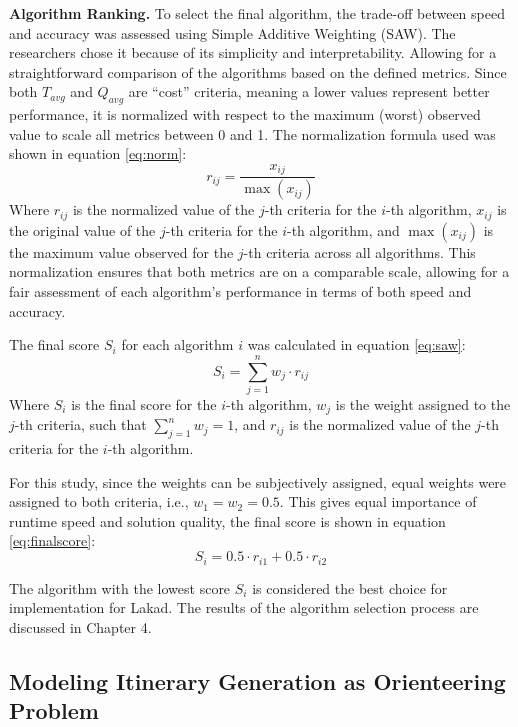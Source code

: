 \textbf{Algorithm Ranking.} To select the final algorithm, the trade-off between speed and accuracy was assessed using Simple Additive Weighting (SAW). The researchers chose it because of its simplicity and interpretability. Allowing for a straightforward comparison of the algorithms based on the defined metrics. Since both $T _{avg}$ and $Q_{avg}$ are “cost” criteria, meaning a lower values represent better performance, it is normalized with respect to the maximum (worst) observed value to scale all metrics between 0 and 1. The normalization formula used was shown in equation \ref{eq:norm}:
\begin{equation}
	\label{eq:norm}
	r _{ij} = \frac{x_{ij}}{\max(x_{ij})}
\end{equation}
Where $r _{ij}$ is the normalized value of the $j$-th criteria for the $i$-th algorithm, $x_{ij}$ is the original value of the $j$-th criteria for the $i$-th algorithm, and $\max(x_{ij})$ is the maximum value observed for the $j$-th criteria across all algorithms. This normalization ensures that both metrics are on a comparable scale, allowing for a fair assessment of each algorithm’s performance in terms of both speed and accuracy. 

The final score $S _{i}$ for each algorithm $i$ was calculated in equation \ref{eq:saw}: 
\begin{equation}
	\label{eq:saw}
	S _{i} = \sum_{j=1}^{n} w_j \cdot r _{ij}
\end{equation}
Where $S _{i}$ is the final score for the $i$-th algorithm, $w_j$ is the weight assigned to the $j$-th criteria, such that $\sum_{j=1}^{n} w_j = 1$, and $r _{ij}$ is the normalized value of the $j$-th criteria for the $i$-th algorithm.

For this study, since the weights can be subjectively assigned, equal weights were assigned to both criteria, i.e., $w _{1} = w _{2} = 0.5$. This gives equal importance of runtime speed and solution quality, the final score is shown in equation \ref{eq:finalscore}:
\begin{equation}
	\label{eq:finalscore}
	S _{i} = 0.5 \cdot r _{i1} + 0.5 \cdot r _{i2}
\end{equation}

The algorithm with the lowest score $S _{i}$ is considered the best choice for implementation for Lakad. The results of the algorithm selection process are discussed in Chapter 4. 

\subsection{Modeling Itinerary Generation as Orienteering Problem}

